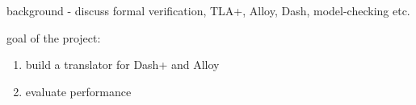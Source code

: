 


background - discuss formal verification, TLA+, Alloy, Dash, model-checking etc.

goal of the project:

\begin{enumerate}
	\item build a translator for Dash+ and Alloy
	\item evaluate performance
\end{enumerate}